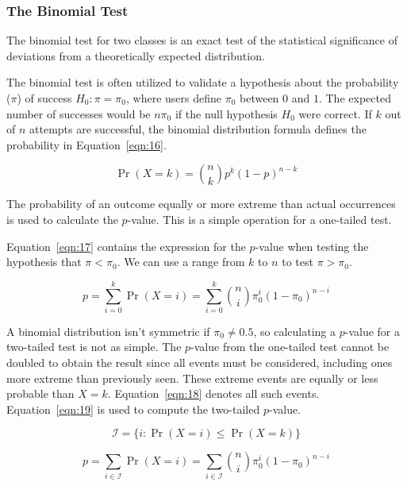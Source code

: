 \documentclass[sn-mathphys-num]{sn-jnl}%
\begin{document}
\subsubsection{The Binomial Test}

The binomial test \cite{howell1992statistical, graphpadGraphPadPrism} for two classes is an exact test of the statistical significance of deviations from a theoretically expected distribution.

The binomial test is often utilized to validate a hypothesis about the probability ($\pi$) of success $H_{0}\colon \pi =\pi_{0}$, where users define $\pi_{0}$ between $0$ and $1$. The expected number of successes would be $n\pi_{0}$ if the null hypothesis $H_{0}$ were correct. If $k$ out of $n$ attempts are successful, the binomial distribution formula defines the probability in Equation~\ref{eqn:16}.

\begin{equation}
	\Pr(X=k)={\binom{n}{k}}p^{k}(1-p)^{n-k}
	\label{eqn:16}
\end{equation}

The probability of an outcome equally or more extreme than actual occurrences is used to calculate the $p$-value. This is a simple operation for a one-tailed test. 

Equation~\ref{eqn:17} contains the expression for the $p$-value when testing the hypothesis that $\pi <\pi_{0}$. We can use a range from $k$ to $n$ to test $\pi >\pi_{0}$.

\begin{equation}
	p=\sum_{i=0}^{k}\Pr(X=i)=\sum_{i=0}^{k}{\binom{n}{i}}\pi_{0}^{i}(1-\pi_{0})^{n-i}
	\label{eqn:17}
\end{equation}

A binomial distribution isn't symmetric if $\pi_{0}\neq 0.5$, so calculating a $p$-value for a two-tailed test is not as simple. The $p$-value from the one-tailed test cannot be doubled to obtain the result since all events must be considered, including ones more extreme than previously seen. These extreme events are equally or less probable than $X=k$. Equation~\ref{eqn:18} denotes all such events. Equation~\ref{eqn:19} is used to compute the two-tailed $p$-value.

\begin{equation}
	{\mathcal{I}}=\{i\colon \Pr(X=i)\leq \Pr(X=k)\}
	\label{eqn:18}
\end{equation}

\begin{equation}
	p=\sum_{i\in {\mathcal{I}}}\Pr(X=i)=\sum_{i\in {\mathcal{I}}}{\binom{n}{i}}\pi_{0}^{i}(1-\pi_{0})^{n-i}
	\label{eqn:19}
\end{equation}
\end{document}
